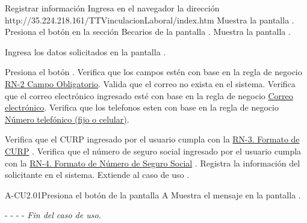 	\begin{UCtrayectoria}{Registrar información }
	    \UCpaso[\UCactor] Ingresa en el navegador la dirección http://35.224.218.161/TTVinculacionLaboral/index.htm
	    \UCpaso[\UCsist] Muestra la pantalla .
		\UCpaso[\UCactor] Presiona el botón  en la sección Becarios de la pantalla .
		\UCpaso[\UCsist] Muestra la pantalla .
    
		\UCpaso[\UCactor] Ingresa los datos solicitados en la pantalla .
		
		\UCpaso[\UCactor] Presiona el botón . 
		\UCpaso[\UCsist] Verifica que los campos estén con base en la regla de negocio \hyperlink{RN2}{RN-2 Campo Obligatorio}. 
		\UCpaso[\UCsist] Valida que el correo no exista en el sistema.
		\UCpaso[\UCsist] Verifica que el correo electrónico ingresado esté con base en la regla de negocio \hyperlink{RN13}{Correo electrónico}. 
		\UCpaso[\UCsist] Verifica que los telefonos esten con base en la regla de negocio \hyperlink{RN10}{Número telefónico (fijo o celular)}. 
		
		\UCpaso[\UCsist] Verifica que el CURP ingresado por el usuario cumpla con la \hyperlink{RN3}{RN-3. Formato de CURP} . 
		\UCpaso[\UCsist] Verifica que el número de seguro social ingresado por el usuario cumpla con la \hyperlink{RN4}{RN-4. Formato de Número de Seguro Social} . 
        \UCpaso[\UCsist] Registra la información del solicitante en el sistema.
	    \UCpaso[\UCsist] Extiende al caso de uso .

		
	\end{UCtrayectoria}
	

	
	

	
	

	\begin{UCtrayectoriaA}{A-CU2.01}{Presiona el botón  de la pantalla }{A}
		\UCpaso[\UCsist] Muestra el mensaje  en la pantalla .
		\item[- -] - - {\em Fin del caso de uso.} 
	\end{UCtrayectoriaA}

